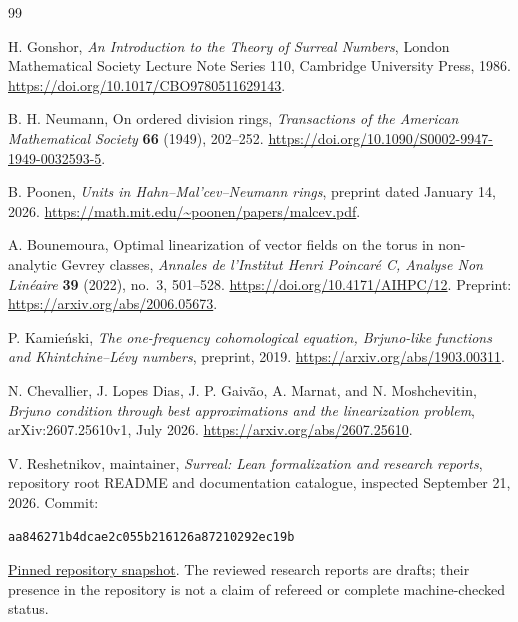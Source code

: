\documentclass[11pt,letterpaper]{article}
\theoremstyle{definition}
\theoremstyle{remark}
\numberwithin{equation}{section}
\begin{document}
\clearpage
\begin{thebibliography}{99}

H. Gonshor,
\emph{An Introduction to the Theory of Surreal Numbers},
London Mathematical Society Lecture Note Series 110,
Cambridge University Press, 1986.
\url{https://doi.org/10.1017/CBO9780511629143}.

B. H. Neumann,
On ordered division rings,
\emph{Transactions of the American Mathematical Society} \textbf{66} (1949),
202--252.
\url{https://doi.org/10.1090/S0002-9947-1949-0032593-5}.

B. Poonen,
\emph{Units in Hahn--Mal'cev--Neumann rings},
preprint dated January 14, 2026.
\url{https://math.mit.edu/~poonen/papers/malcev.pdf}.

A. Bounemoura,
Optimal linearization of vector fields on the torus in non-analytic Gevrey
classes,
\emph{Annales de l'Institut Henri Poincar\'e C, Analyse Non Lin\'eaire}
\textbf{39} (2022), no.~3, 501--528.
\url{https://doi.org/10.4171/AIHPC/12}.
Preprint: \url{https://arxiv.org/abs/2006.05673}.

P. Kamie\'nski,
\emph{The one-frequency cohomological equation, Brjuno-like functions and
Khintchine--L\'evy numbers},
preprint, 2019.
\url{https://arxiv.org/abs/1903.00311}.

N. Chevallier, J. Lopes Dias, J. P. Gaiv\~ao, A. Marnat, and N. Moshchevitin,
\emph{Brjuno condition through best approximations and the linearization
problem}, arXiv:2607.25610v1, July 2026.
\url{https://arxiv.org/abs/2607.25610}.

V. Reshetnikov, maintainer,
\emph{Surreal: Lean formalization and research reports},
repository root README and documentation catalogue, inspected
September 21, 2026.  Commit:
\begin{center}\small\texttt{aa846271b4dcae2c055b216126a87210292ec19b}\end{center}
\href{https://github.com/VladimirReshetnikov/Surreal/tree/aa846271b4dcae2c055b216126a87210292ec19b}{Pinned repository snapshot}.
The reviewed research reports are drafts; their presence in the repository
is not a claim of refereed or complete machine-checked status.

\end{thebibliography}
\end{document}
